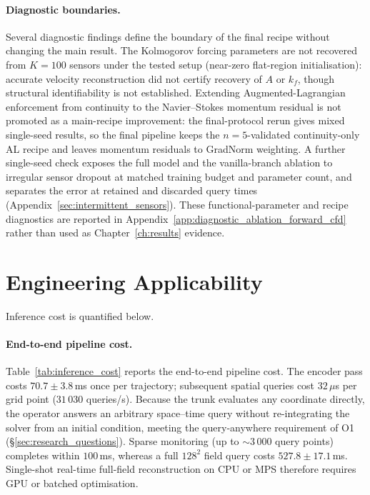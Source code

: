 \paragraph{Diagnostic boundaries.}
Several diagnostic findings define the boundary of the final recipe without changing the main result. The Kolmogorov forcing parameters are not recovered from $K=100$ sensors under the tested setup (near-zero flat-region initialisation): accurate velocity reconstruction did not certify recovery of $A$ or $k_f$, though structural identifiability is not established. Extending Augmented-Lagrangian enforcement from continuity to the Navier--Stokes momentum residual is not promoted as a main-recipe improvement: the final-protocol rerun gives mixed single-seed results, so the final pipeline keeps the $n=5$-validated continuity-only AL recipe and leaves momentum residuals to GradNorm weighting. A further single-seed check exposes the full model and the vanilla-branch ablation to irregular sensor dropout at matched training budget and parameter count, and separates the error at retained and discarded query times (Appendix~\ref{sec:intermittent_sensors}). These functional-parameter and recipe diagnostics are reported in Appendix~\ref{app:diagnostic_ablation_forward_cfd} rather than used as Chapter~\ref{ch:results} evidence.

\section{Engineering Applicability}
\label{sec:engineering_app}

Inference cost is quantified below.

\paragraph{End-to-end pipeline cost.}
Table~\ref{tab:inference_cost} reports the end-to-end pipeline cost. The encoder pass costs $70.7 \pm 3.8$\,ms once per trajectory; subsequent spatial queries cost $32\,\mu$s per grid point ($31\,030$ queries/s). Because the trunk evaluates any coordinate directly, the operator answers an arbitrary space--time query without re-integrating the solver from an initial condition, meeting the query-anywhere requirement of O1 (\S\ref{sec:research_questions}). Sparse monitoring (up to $\sim 3\,000$ query points) completes within $100$\,ms, whereas a full $128^2$ field query costs $527.8 \pm 17.1$\,ms. Single-shot real-time full-field reconstruction on CPU or MPS therefore requires GPU or batched optimisation.

